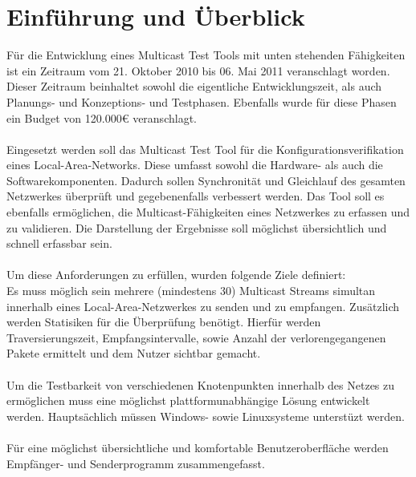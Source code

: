 \chapter{Einführung und Überblick}
Für die Entwicklung eines Multicast Test Tools mit unten stehenden Fähigkeiten
ist ein Zeitraum vom 21. Oktober 2010 bis 06. Mai 2011 veranschlagt worden.
Dieser Zeitraum beinhaltet sowohl die eigentliche Entwicklungszeit, als auch
Planungs- und Konzeptions- und Testphasen. Ebenfalls wurde für diese Phasen
ein Budget von 120.000€ veranschlagt.\\
\\
Eingesetzt werden soll das Multicast Test Tool für die Konfigurationsverifikation
eines Local-Area-Networks. Diese umfasst sowohl die Hardware- als auch die
Softwarekomponenten. Dadurch sollen Synchronität und Gleichlauf des gesamten
Netzwerkes überprüft und gegebenenfalls verbessert werden. Das Tool soll es ebenfalls ermöglichen, die Multicast-Fähigkeiten eines
Netzwerkes zu erfassen und zu validieren. Die Darstellung der Ergebnisse soll
möglichst übersichtlich und schnell erfassbar sein.\\
\\

Um diese Anforderungen zu erfüllen, wurden folgende Ziele definiert:\\
Es muss möglich sein mehrere (mindestens 30) Multicast Streams simultan
innerhalb eines Local-Area-Netzwerkes zu senden und zu empfangen. Zusätzlich
werden Statisiken für die Überprüfung benötigt. Hierfür werden Traversierungszeit,
Empfangsintervalle, sowie Anzahl der verlorengegangenen Pakete ermittelt und dem
Nutzer sichtbar gemacht.\\
\\
Um die Testbarkeit von verschiedenen Knotenpunkten innerhalb des Netzes zu
ermöglichen muss eine möglichst plattformunabhängige Lösung entwickelt werden. Hauptsächlich müssen Windows- 
sowie Linuxsysteme unterstüzt werden. \\
\\
Für eine möglichst übersichtliche und komfortable Benutzeroberfläche werden
Empfänger- und Senderprogramm zusammengefasst. 

